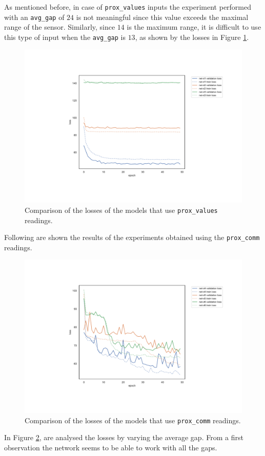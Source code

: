 As mentioned before, in case of \texttt{prox\_values} inputs the 
experiment performed with an \texttt{avg\_gap} of $24$ is not meaningful since 
this value exceeds the maximal range of the sensor. Similarly, since $14$ is the 
maximum range, it is difficult to use this type of input when the \texttt{avg\_gap}  
is $13$, as shown by the losses in Figure \ref{fig:distlossprox_values}.
\begin{figure}[!htb]
	\centering
	\includegraphics[width=.8\textwidth]{contents/images/task1/loss-distributed-prox_values@}%
	\caption{Comparison of the losses of the models that use \texttt{prox\_values} 
		readings.}
	\label{fig:distlossprox_values}
\end{figure}

Following are shown the results of the experiments obtained using the 
\texttt{prox\_comm} readings. 
\begin{figure}[!htb]
	\centering
	\includegraphics[width=.8\textwidth]{contents/images/task1/loss-distributed-prox_comm@}%
	\caption{Comparison of the losses of the models that use \texttt{prox\_comm} 
		readings.}
	\label{fig:distlossprox_comm}
\end{figure}
In Figure \ref{fig:distlossprox_comm}, are analysed the losses by varying the 
average gap. From a first observation the network seems to be able to work with 
all the gaps.

